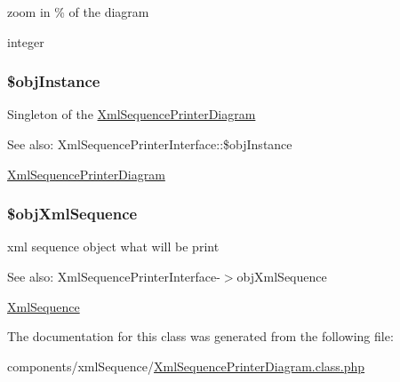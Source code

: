 zoom in \% of the diagram

integer \hypertarget{class_xml_sequence_printer_diagram_917d057900327b25608ed26c927eac3b}{
\subsubsection[{\$objInstance}]{\setlength{\rightskip}{0pt plus 5cm}\$objInstance}}
\label{class_xml_sequence_printer_diagram_917d057900327b25608ed26c927eac3b}


Singleton of the \hyperlink{class_xml_sequence_printer_diagram}{XmlSequencePrinterDiagram}

\begin{Desc}
\item[See also:]XmlSequencePrinterInterface::\$objInstance\end{Desc}
\hyperlink{class_xml_sequence_printer_diagram}{XmlSequencePrinterDiagram} \hypertarget{class_xml_sequence_printer_diagram_eefa469c1b13fe1fec040c910b720034}{
\subsubsection[{\$objXmlSequence}]{\setlength{\rightskip}{0pt plus 5cm}\$objXmlSequence}}
\label{class_xml_sequence_printer_diagram_eefa469c1b13fe1fec040c910b720034}


xml sequence object what will be print

\begin{Desc}
\item[See also:]XmlSequencePrinterInterface-$>$objXmlSequence\end{Desc}
\hyperlink{class_xml_sequence}{XmlSequence} 

The documentation for this class was generated from the following file:\begin{CompactItemize}
\item 
components/xmlSequence/\hyperlink{_xml_sequence_printer_diagram_8class_8php}{XmlSequencePrinterDiagram.class.php}\end{CompactItemize}

